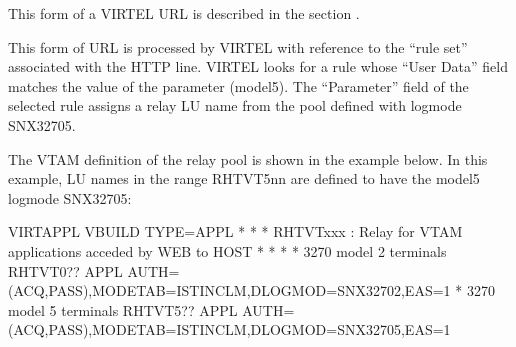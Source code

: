 \documentclass[letterpaper,10pt,english]{sphinxmanual}
\begin{document}
\begin{sphinxVerbatim}[commandchars=\\\{\}]
\end{sphinxVerbatim}

This form of a VIRTEL URL is described in the section {\hyperref[\detokenize{User_Guide:v457ug-dynamic-url}]{}}.

This form of URL is processed by VIRTEL with reference to the “rule set” associated with the HTTP line. VIRTEL looks for
a rule whose “User Data” field matches the value of the parameter (model5). The “Parameter” field of the selected
rule assigns a relay LU name from the pool defined with logmode SNX32705.

The VTAM definition of the relay pool is shown in the example below. In this example, LU names in the range
RHTVT5nn are defined to have the model5 logmode SNX32705:

\begin{sphinxVerbatim}[commandchars=\\\{\}]
VIRTAPPL VBUILD TYPE=APPL
* \PYGZhy{}\PYGZhy{}\PYGZhy{}\PYGZhy{}\PYGZhy{}\PYGZhy{}\PYGZhy{}\PYGZhy{}\PYGZhy{}\PYGZhy{}\PYGZhy{}\PYGZhy{}\PYGZhy{}\PYGZhy{}\PYGZhy{}\PYGZhy{}\PYGZhy{}\PYGZhy{}\PYGZhy{}\PYGZhy{}\PYGZhy{}\PYGZhy{}\PYGZhy{}\PYGZhy{}\PYGZhy{}\PYGZhy{}\PYGZhy{}\PYGZhy{}\PYGZhy{}\PYGZhy{}\PYGZhy{}\PYGZhy{}\PYGZhy{}\PYGZhy{}\PYGZhy{}\PYGZhy{}\PYGZhy{}\PYGZhy{}\PYGZhy{}\PYGZhy{}\PYGZhy{}\PYGZhy{}\PYGZhy{}\PYGZhy{}\PYGZhy{}\PYGZhy{}\PYGZhy{}\PYGZhy{}\PYGZhy{}\PYGZhy{}\PYGZhy{}\PYGZhy{}\PYGZhy{}\PYGZhy{}\PYGZhy{}\PYGZhy{}\PYGZhy{}\PYGZhy{}\PYGZhy{}\PYGZhy{}\PYGZhy{}\PYGZhy{}\PYGZhy{}\PYGZhy{}\PYGZhy{}\PYGZhy{} *
* RHTVTxxx : Relay for VTAM applications acceded by WEB to HOST *
* \PYGZhy{}\PYGZhy{}\PYGZhy{}\PYGZhy{}\PYGZhy{}\PYGZhy{}\PYGZhy{}\PYGZhy{}\PYGZhy{}\PYGZhy{}\PYGZhy{}\PYGZhy{}\PYGZhy{}\PYGZhy{}\PYGZhy{}\PYGZhy{}\PYGZhy{}\PYGZhy{}\PYGZhy{}\PYGZhy{}\PYGZhy{}\PYGZhy{}\PYGZhy{}\PYGZhy{}\PYGZhy{}\PYGZhy{}\PYGZhy{}\PYGZhy{}\PYGZhy{}\PYGZhy{}\PYGZhy{}\PYGZhy{}\PYGZhy{}\PYGZhy{}\PYGZhy{}\PYGZhy{}\PYGZhy{}\PYGZhy{}\PYGZhy{}\PYGZhy{}\PYGZhy{}\PYGZhy{}\PYGZhy{}\PYGZhy{}\PYGZhy{}\PYGZhy{}\PYGZhy{}\PYGZhy{}\PYGZhy{}\PYGZhy{}\PYGZhy{}\PYGZhy{}\PYGZhy{}\PYGZhy{}\PYGZhy{}\PYGZhy{}\PYGZhy{}\PYGZhy{}\PYGZhy{}\PYGZhy{}\PYGZhy{}\PYGZhy{}\PYGZhy{}\PYGZhy{}\PYGZhy{}\PYGZhy{} *
* 3270 model 2 terminals
RHTVT0?? APPL AUTH=(ACQ,PASS),MODETAB=ISTINCLM,DLOGMOD=SNX32702,EAS=1
* 3270 model 5 terminals
RHTVT5?? APPL AUTH=(ACQ,PASS),MODETAB=ISTINCLM,DLOGMOD=SNX32705,EAS=1
\end{sphinxVerbatim}
\end{document}

